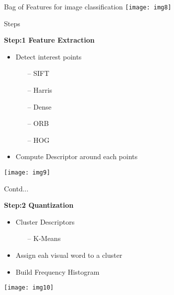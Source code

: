 \documentclass{beamer}
\newcommand\myheading[1]{%
  \par\bigskip
  {\large\bfseries#1}\par\smallskip}
\begin{document}
\begin{frame}{Bag of Features for image classification}
	\texttt{[image: img8]}
\end{frame}

\begin{frame}{Steps}
	\begin{flushleft}
		\myheading{Step:1 Feature Extraction}
		\begin{itemize}
			\item Detect interest points
			\begin{itemize}
				\item[--] SIFT
				\item[--] Harris
				\item[--] Dense
				\item[--] ORB
				\item[--] HOG
			\end{itemize}
			\item Compute Descriptor around each points
		\end{itemize}
	\end{flushleft}
	\texttt{[image: img9]}
\end{frame}

\begin{frame}{Contd...}
	\begin{flushleft}
		\myheading{Step:2 Quantization}
		\begin{itemize}
			\item Cluster Descriptors
			\begin{itemize}
				\item[--] K-Means
			\end{itemize}
			\item Assign eah visual word to a cluster
			\item Build Frequency Histogram
		\end{itemize}
	\end{flushleft}
	\texttt{[image: img10]}
\end{frame}
\end{document}

